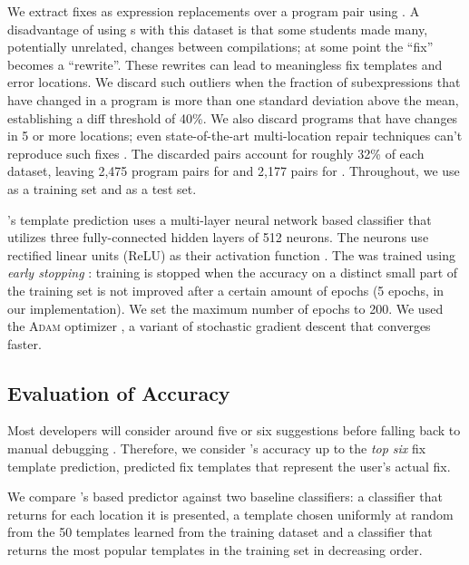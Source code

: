 %
We extract fixes as expression replacements over a program pair using \diffsym.
A disadvantage of using \diffsym s with this dataset is that some students
made many, potentially unrelated, changes between compilations; at some point
the ``fix'' becomes a ``rewrite''. These rewrites can lead to
meaningless fix templates and error locations. We discard such outliers when the
fraction of subexpressions that have changed in a program is more than one
standard deviation above the mean, establishing a diff threshold of 40\%. We
also discard programs that have changes in 5 or more locations; even
state-of-the-art multi-location repair techniques can't reproduce such fixes
\citep{Saha_2019}. The discarded pairs account for roughly 32\% of each
dataset, leaving 2,475 program pairs for \SPRING and 2,177 pairs for \FALL.
Throughout, we use \SPRING as a training set and \FALL as a test set.

%
\toolname's template prediction
uses a multi-layer neural network \dnn based
classifier that utilizes three fully-connected
hidden layers of 512 neurons. The neurons use
rectified linear units (ReLU) as their activation
function \citep{Nair2010-xg}.
%
The \dnn was trained using \emph{early stopping}
\cite{Hastie2009-bn}:
training is stopped when the accuracy on a distinct
small part of the training set is not improved after
a certain amount of epochs (5 epochs, in our implementation).
%
We set the maximum number of epochs to 200.
%
We used the \textsc{Adam} optimizer \citep{Kingma2014-ng},
a variant of stochastic gradient descent that converges faster.

\subsection{Evaluation of Accuracy}

\label{sec:eval:accuracy}

Most developers will consider around five or six suggestions before
falling back to manual debugging \citep{Kochhar2016-oc}.
%
Therefore, we consider \toolname's accuracy up to the \emph{top six}
fix template prediction, \ie predicted fix templates that represent
the user's actual fix.

%
We compare \toolname's \dnn based predictor against two baseline
classifiers: a \random classifier that returns
for each location it is presented, a template
chosen uniformly at random from the 50 templates
learned from the \SPRING training dataset and
a \popular classifier that returns the most
popular templates in the training set in
decreasing order.

